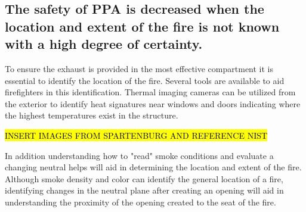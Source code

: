 \documentclass{article}
\begin{document}
\subsection{The safety of PPA is decreased when the location and extent of the fire is not known with a high degree of certainty.}
To ensure the exhaust is provided in the most effective compartment it is essential to identify the location of the fire. Several tools are available to aid firefighters in this identification. Thermal imaging cameras can be utilized from the exterior to identify heat signatures near windows and doors indicating where the highest temperatures exist in the structure. 

\hl{INSERT IMAGES FROM SPARTENBURG AND REFERENCE NIST}

In addition understanding how to "read" smoke conditions and evaluate a changing neutral helps will aid in determining the location and extent of the fire. Although smoke density and color can identify the general location of a fire, identifying changes in the neutral plane after creating an opening will aid in understanding the proximity of the opening created to the seat of the fire. 
\end{document}
